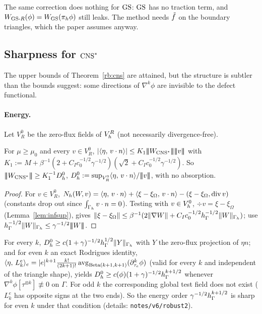 The same correction does nothing for $\mathrm{GS}$: $\mathrm{GS}$ has no traction term, and $W_{\mathrm{GS}\text{-}R}(\phi)=W_{\mathrm{GS}}(\pi_h\phi)$ still leaks. The method needs $\tilde f$ on the boundary triangles, which the paper assumes anyway.

\subsection{Sharpness for $\mathrm{CNS}^\ast$}\label{rb:sec:lower}

The upper bounds of Theorem~\ref{rb:cns} are attained, but the structure is subtler than the bounds suggest: some directions of $\nabla^k\phi$ are invisible to the defect functional.

\paragraph{Energy.} Let $V_R^0$ be the zero-flux fields of $V_h^R$ (not necessarily divergence-free).

\begin{theorem}\label{rb:energy}
For $\mu\ge\mu_0$ and every $v\in V_R^0$, $|\ip\eta{v\cdot n}|\le K_1\tnorm{W_{\CNS}}\tnorm v$ with
$K_1:=M+\beta^{-1}(2+C_Ic_0^{-1/2}\gamma^{-1/2})(\sqrt2+C_Ic_0^{-1/2}\gamma^{-1/2})$. So $|\!|\!|W_{\mathrm{CNS}^\ast}|\!|\!|\ge K_1^{-1}D^0_h$, $D^0_h:=\sup_{V_R^0}\langle \eta,\, v\cdot n\rangle/|\!|\!|v|\!|\!|$, with no absorption.
\end{theorem}

\begin{proof}
For $v\in V_R^0$, $N_h(W,v)=\langle \eta,\, v\cdot n\rangle+\langle \xi-\xi_\Omega,\, v\cdot n\rangle-(\xi-\xi_\Omega,\operatorname{div} v)$ (constants drop out since $\int_{\Gamma_h}v\cdot n=0$). Testing with $v\in V_h^0$, $\div v=\xi-\xi_\Omega$ (Lemma~\ref{lem:infsup}), gives $\lVert \xi-\xi_\Omega\rVert\le\beta^{-1}(2\lVert \nabla W\rVert+C_Ic_0^{-1/2}h_\Gamma^{-1/2}\lVert W\rVert_{\Gamma_h})$; use $h_\Gamma^{-1/2}\lVert W\rVert_{\Gamma_h}\le\gamma^{-1/2}|\!|\!|W|\!|\!|$.
\end{proof}

For every $k$, $D^0_h\ge c(1+\gamma)^{-1/2}h_\Gamma^{1/2}\lVert Y\rVert_{\Gamma_h}$ with $Y$ the zero-flux projection of $\eta n$; and for even $k$ an exact Rodrigues identity, $\langle \eta,\, L^e_k\rangle_e=|e|^{k+1}\frac{k!}{(2k+1)!}\,\mathrm{avg}_{\mathrm{Beta}(k+1,k+1)}(\partial^k_{\tau_e}\phi)$ (valid for every $k$ and independent of the triangle shape), yields $D^0_h\ge c(\phi)(1+\gamma)^{-1/2}h_\Gamma^{k+1/2}$ whenever $\nabla^k\phi[\tau^{\otimes k}]\not\equiv0$ on $\Gamma$. For odd $k$ the corresponding global test field does not exist ($L^e_k$ has opposite signs at the two ends). So the energy order $\gamma^{-1/2}h_\Gamma^{k+1/2}$ is sharp for even $k$ under that condition (details: \texttt{notes/v6/robust2}).

